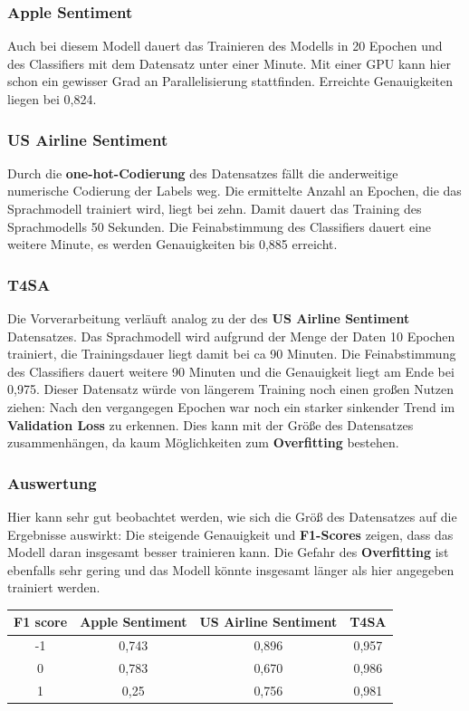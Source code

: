 \subsubsection*{Apple Sentiment}
Auch bei diesem Modell dauert das Trainieren des Modells in 20 Epochen und des Classifiers mit dem Datensatz unter einer Minute. Mit einer GPU kann hier schon ein gewisser Grad an Parallelisierung stattfinden.  Erreichte Genauigkeiten liegen bei 0,824. 


\subsubsection*{US Airline Sentiment}
Durch die \textbf{one-hot-Codierung} des Datensatzes f\"allt die anderweitige numerische Codierung der Labels weg. Die ermittelte Anzahl an Epochen, die das Sprachmodell trainiert wird, liegt bei zehn. Damit dauert das Training des Sprachmodells 50 Sekunden. Die Feinabstimmung des Classifiers dauert eine weitere Minute, es werden Genauigkeiten bis 0,885 erreicht.

\subsubsection*{T4SA}
Die Vorverarbeitung verl\"auft analog zu der des \textbf{US Airline Sentiment} Datensatzes. Das Sprachmodell wird aufgrund der Menge der Daten 10 Epochen trainiert, die Trainingsdauer liegt damit bei ca 90 Minuten. Die Feinabstimmung des Classifiers dauert weitere 90 Minuten und die Genauigkeit liegt am Ende bei 0,975. Dieser Datensatz w\"urde von l\"angerem Training noch einen gro{\ss}en Nutzen ziehen: Nach den vergangegen Epochen war noch ein starker sinkender Trend im \textbf{Validation Loss}  zu erkennen. Dies kann mit der Gr\"o{\ss}e des Datensatzes zusammenh\"angen, da kaum M\"oglichkeiten zum \textbf{Overfitting} bestehen.

\subsubsection*{Auswertung}
Hier kann sehr gut beobachtet werden, wie sich die Gr\"o{\ss} des Datensatzes auf die Ergebnisse auswirkt: Die steigende Genauigkeit und \textbf{F1-Scores} zeigen, dass das Modell daran insgesamt besser trainieren kann. Die Gefahr des \textbf{Overfitting} ist ebenfalls sehr gering und das Modell k\"onnte insgesamt l\"anger als hier angegeben trainiert werden.
\begin{center}
\begin{tabular}{|c||c|c|c|}
\hline
F1 score & Apple Sentiment & US Airline Sentiment & T4SA\\ 
\hline\hline
-1 & 0,743 & 0,896 & 0,957\\
\hline
0 & 0,783 & 0,670 & 0,986\\ 
\hline
1 & 0,25 & 0,756 &  0,981\\
\hline    
\end{tabular}
\end{center}

